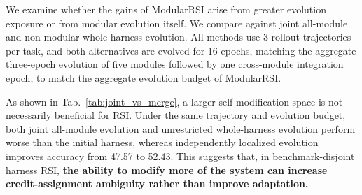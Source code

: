 \documentclass{article} %
\begin{document}
We examine whether the gains of ModularRSI arise from greater evolution exposure or from modular evolution itself. We compare against joint all-module and non-modular whole-harness evolution. All methods use 3 rollout trajectories per task, and both alternatives are evolved for 16 epochs, matching the aggregate three-epoch evolution of five modules followed by one cross-module integration epoch,  to match the aggregate evolution budget of ModularRSI.


\begin{table}
\vspace{-16pt}
\centering
\footnotesize
\setlength{\tabcolsep}{4pt}

\caption{Comparison of different harness evolution strategies on TerminalBench 2.0.}
\label{tab:joint_vs_merge}


\vspace{-8pt}
\end{table}


As shown in Tab.~\ref{tab:joint_vs_merge}, a larger self-modification space is not necessarily beneficial for RSI. Under the same trajectory and evolution budget, both joint all-module evolution and unrestricted whole-harness evolution perform worse than the initial harness, whereas independently localized evolution improves accuracy from 47.57 to 52.43. This suggests that, in benchmark-disjoint harness RSI, \textbf{the ability to modify more of the system can increase credit-assignment ambiguity rather than improve adaptation.}
\end{document}
